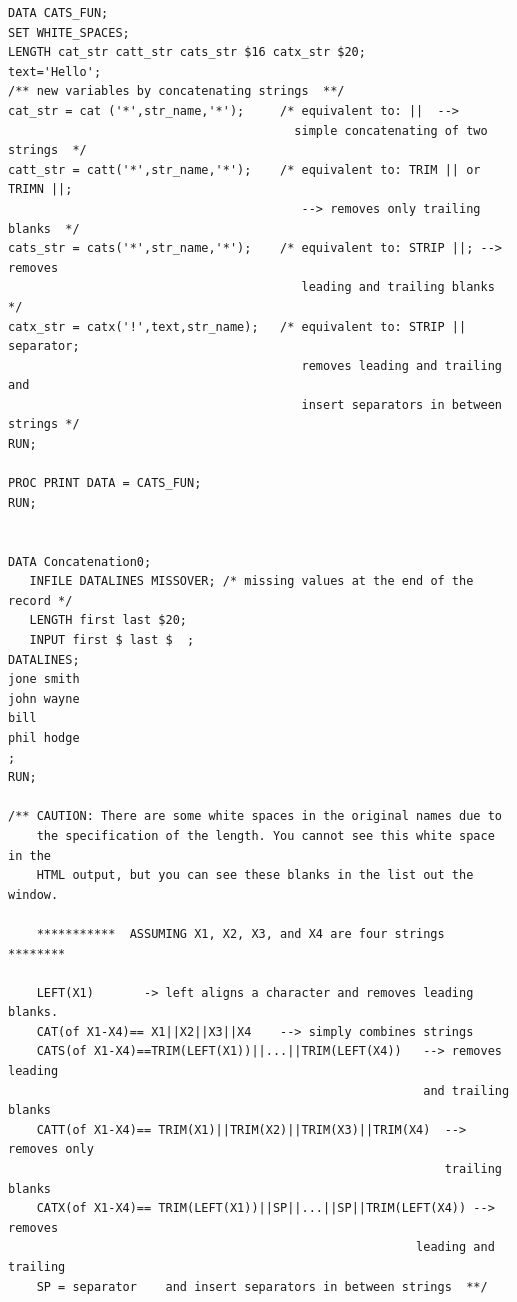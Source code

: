 \documentclass[
]{book}
\begin{document}
\begin{verbatim}
DATA CATS_FUN;
SET WHITE_SPACES;
LENGTH cat_str catt_str cats_str $16 catx_str $20;
text='Hello';
/** new variables by concatenating strings  **/
cat_str = cat ('*',str_name,'*');     /* equivalent to: ||  --> 
                                        simple concatenating of two strings  */
catt_str = catt('*',str_name,'*');    /* equivalent to: TRIM || or TRIMN ||; 
                                         --> removes only trailing blanks  */
cats_str = cats('*',str_name,'*');    /* equivalent to: STRIP ||; --> removes 
                                         leading and trailing blanks      */
catx_str = catx('!',text,str_name);   /* equivalent to: STRIP || separator; 
                                         removes leading and trailing and 
                                         insert separators in between strings */
RUN;

PROC PRINT DATA = CATS_FUN;
RUN;


DATA Concatenation0;
   INFILE DATALINES MISSOVER; /* missing values at the end of the record */
   LENGTH first last $20;
   INPUT first $ last $  ;
DATALINES;
jone smith
john wayne
bill 
phil hodge
;
RUN;

/** CAUTION: There are some white spaces in the original names due to
    the specification of the length. You cannot see this white space in the
    HTML output, but you can see these blanks in the list out the window.

    ***********  ASSUMING X1, X2, X3, and X4 are four strings   ********

    LEFT(X1)       -> left aligns a character and removes leading blanks. 
    CAT(of X1-X4)== X1||X2||X3||X4    --> simply combines strings
    CATS(of X1-X4)==TRIM(LEFT(X1))||...||TRIM(LEFT(X4))   --> removes leading 
                                                          and trailing blanks
    CATT(of X1-X4)== TRIM(X1)||TRIM(X2)||TRIM(X3)||TRIM(X4)  --> removes only 
                                                             trailing blanks
    CATX(of X1-X4)== TRIM(LEFT(X1))||SP||...||SP||TRIM(LEFT(X4)) --> removes 
                                                         leading and trailing                                                                
    SP = separator    and insert separators in between strings  **/
                                                                    

\end{verbatim}
\end{document}
